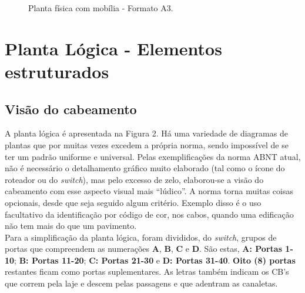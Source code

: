 \documentclass[	DIV=calc,%
							paper=a4,%
							fontsize=12pt,%
							onecolumn]{scrartcl}	 					%
\begin{document}


\begin{figure}
	\noindent{}
	\caption{Planta física com mobília - Formato A3.}
	\label{fig1}
\end{figure}

\clearpage
{}
\recalctypearea


\section{Planta Lógica - Elementos estruturados}

\subsection{Visão do cabeamento}
A planta lógica é apresentada na Figura 2. Há uma variedade de diagramas de plantas que por muitas vezes excedem a própria norma, sendo impossível de se ter um padrão uniforme e universal. Pelas exemplificações da norma ABNT atual, não é necessário o detalhamento gráfico muito elaborado (tal como o ícone do roteador ou do \textit{switch}), mas pelo excesso de zelo, elaborou-se a visão do cabeamento com esse aspecto visual mais ``lúdico''. A norma torna muitas coisas opcionais, desde que seja seguido algum critério. Exemplo disso é o uso facultativo da identificação por código de cor, nos cabos, quando uma edificação não tem mais do que um pavimento.
\\

Para a simplificação da planta lógica, foram divididos, do \textit{switch}, grupos de portas que compreendem as numerações \textbf{A}, \textbf{B}, \textbf{C} e \textbf{D}. São estas, \textbf{A: Portas 1-10}; \textbf{B: Portas 11-20}; \textbf{C: Portas 21-30} e \textbf{D: Portas 31-40}. \textbf{Oito (8) portas} restantes ficam como portas suplementares. As letras também indicam os CB's que correm pela laje e descem pelas passagens e que adentram as canaletas.
\\
\end{document}
